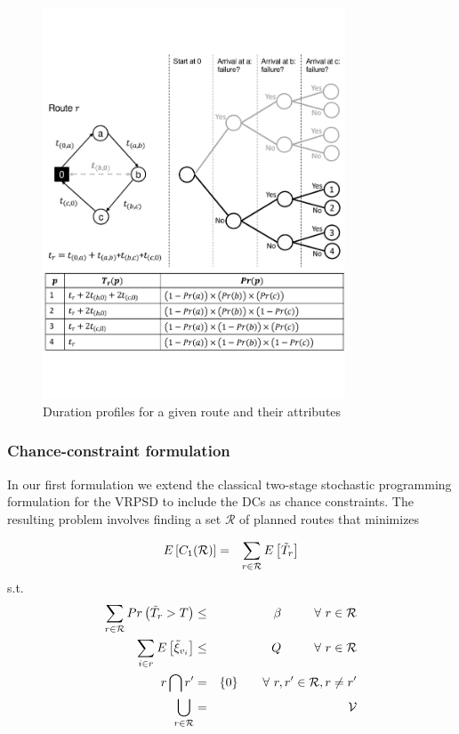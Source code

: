 \begin{figure}
    \begin{center}
    \includegraphics[width=9cm,clip=true]{./img/f_vrpsddc_profiles}
    \caption{Duration profiles for a given route and their attributes}\label{f.vrpsd.dc.profiles}
    \end{center}
\end{figure}

\subsubsection{Chance-constraint formulation}\label{s.vrpsd.dc.CC}
In our first formulation we extend the classical two-stage stochastic programming formulation for the VRPSD to include the DCs as chance constraints. The resulting problem involves finding a set $\mathcal{R}$ of planned routes that minimizes

\begin{eqnarray}\label{eq.vrpsd.dc.CC}
\small
E\left[C_1(\mathcal{R})\right] &=&\sum_{r\in\mathcal{R}}E\left[\tilde{T}_r\right]\label{eq.vrpsd.dc.CC.OF}
\end{eqnarray}
\noindent s.t.
\begin{eqnarray}
\small
\label{eq.vrpsd.dc.CC.DC} \sum_{r\in\mathcal{R}}Pr\left(\tilde{T}_r>T\right)&\leq&\beta\ \ \ \ \ \ \ \ \forall \ r\in \mathcal{R}\\
\label{eq.vrpsd.dc.CC.QC} \sum_{i\in r}E\left[\tilde{\xi}_{v_i}\right]&\leq&Q\ \ \ \ \ \ \ \ \forall \ r\in \mathcal{R}\\
\label{eq.vrpsd.dc.CUSTOMER-COVERTURE} r\bigcap r'&=&\{0\}\ \ \ \ \ \ \forall \ r,r'\in\mathcal{R},r\neq r'\\
\label{eq.vrpsd.dc.SINGLE-VISIT} \bigcup_{r\in \mathcal{R}}&=&\mathcal{V}
\end{eqnarray}

